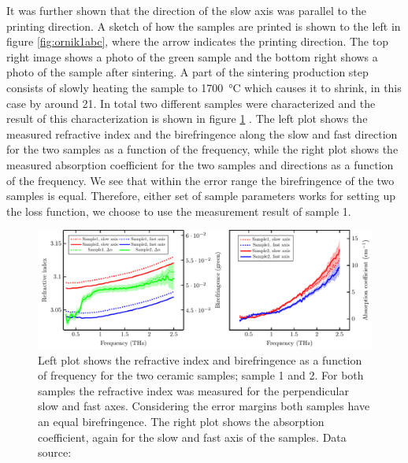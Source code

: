 It was further shown that the direction of the slow axis was parallel to the printing direction. A sketch of how the samples are printed is shown to the left in figure \ref{fig:ornik1abc}, where the arrow indicates the printing direction. The top right image shows a photo of the green sample and the bottom right shows a photo of the sample after sintering. A part of the sintering production step consists of slowly heating the sample to \SI{1700}{\celsius} which causes it to shrink, in this case by around \SI{21}{\volpercent}. In total two different samples were characterized and the result of this characterization is shown in figure \ref{fig:ri_abs} \cite{Ornik2021}. The left plot shows the measured refractive index and the birefringence along the slow and fast direction for the two samples as a function of the frequency, while the right plot shows the measured absorption coefficient for the two samples and directions as a function of the frequency. We see that within the error range the birefringence of the two samples is equal. Therefore, either set of sample parameters works for setting up the loss function, we choose to use the measurement result of sample 1. 

\begin{figure}[ht]
    \centering
    \includegraphics[scale=0.73]{images/results/plots/ceramic/ri_bf.pdf}
    \caption{Left plot shows the refractive index and birefringence as a function of frequency for the two ceramic  samples; sample 1 and 2. For both samples the refractive index was measured for the perpendicular slow and fast axes. Considering the error margins both samples have an equal birefringence. The right plot shows the absorption coefficient, again for the slow and fast axis of the samples. Data source: \cite{Ornik2021}}
    \label{fig:ri_abs}
\end{figure}

